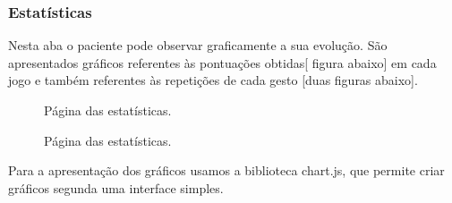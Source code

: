 \documentclass{TTUPhD}
\begin{document}
\newpage

\subsubsection{Estatísticas}

Nesta aba o paciente pode observar graficamente a sua evolução. São apresentados gráficos referentes às pontuações obtidas[ figura abaixo]
em cada jogo e também referentes às repetições de cada gesto [duas figuras abaixo].

\begin{figure}[h!]
    \center
    \caption{Página das estatísticas.}
    \label{fig:patient4}
\end{figure}
\begin{figure}[h!]
    \center
    \caption{Página das estatísticas.}
    \label{fig:patient8}
\end{figure}

Para a apresentação dos gráficos usamos a biblioteca chart.js, que permite criar gráficos segunda uma interface simples.
\end{document}
